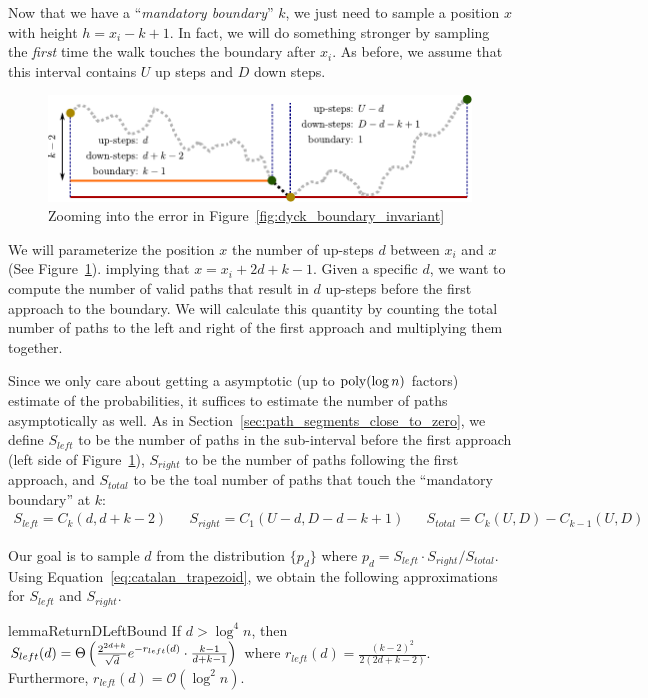 Now that we have a ``\emph{mandatory boundary}'' $k$, we just need to sample a position $x$ with height $h = x_i-k+1$.
In fact, we will do something stronger by sampling the \emph{first} time the walk touches the boundary after $x_i$.
As before, we assume that this interval contains $U$ up steps and $D$ down steps.
\begin{figure}[htpb]
    \centering
    \includegraphics[width=\textwidth]{images/dyck_first_approach_sampling.pdf}
    \caption{Zooming into the error in Figure~\ref{fig:dyck_boundary_invariant}}
    \label{fig:dyck_first_approach_sampling}
\end{figure}

We will parameterize the position $x$ the number of up-steps $d$ between $x_i$ and $x$ (See Figure~\ref{fig:dyck_first_approach_sampling}).
implying that $x = x_{i} + 2d + k - 1$.
Given a specific $d$, we want to compute the number of valid paths that result in
$d$ up-steps before the first approach to the boundary.
We will calculate this quantity by counting the total number of paths to the left and right
of the first approach and multiplying them together.

Since we only care about getting a asymptotic (up to $\mathrm{poly}(\log n)$ factors) estimate of the probabilities,
it suffices to estimate the number of paths asymptotically as well.
As in Section~\ref{sec:path_segments_close_to_zero}, we define
$S_{left}$ to be the number of paths in the sub-interval before the first approach (left side of Figure~\ref{fig:dyck_first_approach_sampling}),
$S_{right}$ to be the number of paths following the first approach,
and $S_{total}$ to be the toal number of paths that touch the ``mandatory boundary'' at $k$:
\begin{align*}
    S_{left} = C_{k}(d, d+k-2)
    &&S_{right} = C_1(U-d, D-d-k+1)
    &&S_{total} = C_k(U,D) - C_{k-1}(U,D)
\end{align*}

Our goal is to sample $d$ from the distribution $\{ p_d\}$ where $p_d = S_{left}\cdot S_{right}/S_{total}$.
Using Equation~\ref{eq:catalan_trapezoid}, we obtain the following approximations for $S_{left}$ and $S_{right}$.
\begin{restatable}{lemma}{ReturnDLeftBound}
\label{lem:ReturnDLeftBound}
If $d > \log^4 n$, then $S_{left}(d)
= \Theta\left( \frac{2^{2d+k}}{\sqrt{d}}\mathlarger e^{-r_{left}(d)}\cdot \frac{k-1}{d+k-1}\right)$
where $r_{left}(d) = \frac{(k-2)^2}{2(2d+k-2)}$.
Furthermore, $r_{left}(d)=\mathcal O(\log^2 n)$.
\end{restatable}

